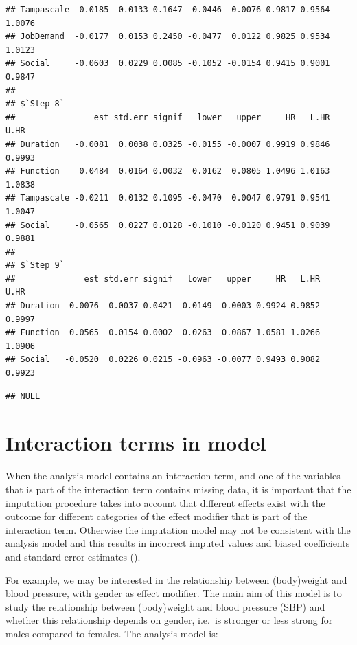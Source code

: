 \documentclass[
]{book}
\newenvironment{Shaded}{\begin{snugshade}}{\end{snugshade}}
\newcommand{\NormalTok}[1]{#1}
\newcommand{\OperatorTok}[1]{\textcolor[rgb]{0.81,0.36,0.00}{\textbf{#1}}}
\begin{document}
\begin{verbatim}
## Tampascale -0.0185  0.0133 0.1647 -0.0446  0.0076 0.9817 0.9564 1.0076
## JobDemand  -0.0177  0.0153 0.2450 -0.0477  0.0122 0.9825 0.9534 1.0123
## Social     -0.0603  0.0229 0.0085 -0.1052 -0.0154 0.9415 0.9001 0.9847
## 
## $`Step 8`
##                est std.err signif   lower   upper     HR   L.HR   U.HR
## Duration   -0.0081  0.0038 0.0325 -0.0155 -0.0007 0.9919 0.9846 0.9993
## Function    0.0484  0.0164 0.0032  0.0162  0.0805 1.0496 1.0163 1.0838
## Tampascale -0.0211  0.0132 0.1095 -0.0470  0.0047 0.9791 0.9541 1.0047
## Social     -0.0565  0.0227 0.0128 -0.1010 -0.0120 0.9451 0.9039 0.9881
## 
## $`Step 9`
##              est std.err signif   lower   upper     HR   L.HR   U.HR
## Duration -0.0076  0.0037 0.0421 -0.0149 -0.0003 0.9924 0.9852 0.9997
## Function  0.0565  0.0154 0.0002  0.0263  0.0867 1.0581 1.0266 1.0906
## Social   -0.0520  0.0226 0.0215 -0.0963 -0.0077 0.9493 0.9082 0.9923
\end{verbatim}

\begin{Shaded}
\end{Shaded}

\begin{verbatim}
## NULL
\end{verbatim}

\hypertarget{interaction-terms-in-model}{%
\section{Interaction terms in model}\label{interaction-terms-in-model}}

When the analysis model contains an interaction term, and one of the variables that is part of the interaction term contains missing data, it is important that the imputation procedure takes into account that different effects exist with the outcome for different categories of the effect modifier that is part of the interaction term. Otherwise the imputation model may not be consistent with the analysis model and this results in incorrect imputed values and biased coefficients and standard error estimates (\citet{Bartlett2015}).

For example, we may be interested in the relationship between (body)weight and blood pressure, with gender as effect modifier. The main aim of this model is to study the relationship between (body)weight and blood pressure (SBP) and whether this relationship depends on gender, i.e.~is stronger or less strong for males compared to females. The analysis model is:
\end{document}
